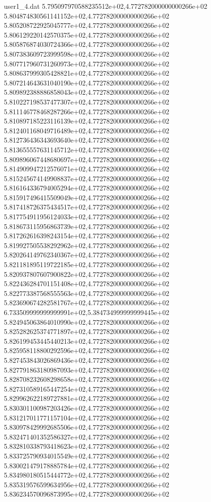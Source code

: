 \begin{filecontents}{user1_4.dat}
5.795097970588235512e+02,4.772782000000000266e+02
5.804874830561141152e+02,4.772782000000000266e+02
5.805208722925045777e+02,4.772782000000000266e+02
5.806129220142570375e+02,4.772782000000000266e+02
5.805876874030724366e+02,4.772782000000000266e+02
5.807383609723999598e+02,4.772782000000000266e+02
5.807717960731260973e+02,4.772782000000000266e+02
5.808637999305428821e+02,4.772782000000000266e+02
5.807214643631040190e+02,4.772782000000000266e+02
5.809892388886858043e+02,4.772782000000000266e+02
5.810227198537477307e+02,4.772782000000000266e+02
5.811146778468287266e+02,4.772782000000000266e+02
5.810897185223116139e+02,4.772782000000000266e+02
5.812401168049716489e+02,4.772782000000000266e+02
5.812736436343693640e+02,4.772782000000000266e+02
5.813655557631145712e+02,4.772782000000000266e+02
5.809896067448680697e+02,4.772782000000000266e+02
5.814909947212576071e+02,4.772782000000000266e+02
5.815245674149908837e+02,4.772782000000000266e+02
5.816164336794005294e+02,4.772782000000000266e+02
5.815917496415509049e+02,4.772782000000000266e+02
5.817418726375434517e+02,4.772782000000000266e+02
5.817754911956124033e+02,4.772782000000000266e+02
5.818673115956863739e+02,4.772782000000000266e+02
5.817262616398243154e+02,4.772782000000000266e+02
5.819927505538292962e+02,4.772782000000000266e+02
5.820264149762340367e+02,4.772782000000000266e+02
5.821181895119722185e+02,4.772782000000000266e+02
5.820937807607900822e+02,4.772782000000000266e+02
5.822436284701151408e+02,4.772782000000000266e+02
5.822773387568555563e+02,4.772782000000000266e+02
5.823690674282581767e+02,4.772782000000000266e+02
6.733509999999999991e+02,5.384734999999999445e+02
5.824945063864010990e+02,4.772782000000000266e+02
5.825282625374771897e+02,4.772782000000000266e+02
5.826199453445440213e+02,4.772782000000000266e+02
5.825958118800292596e+02,4.772782000000000266e+02
5.827453843026869436e+02,4.772782000000000266e+02
5.827791863180987093e+02,4.772782000000000266e+02
5.828708232608298658e+02,4.772782000000000266e+02
5.827310589165447254e+02,4.772782000000000266e+02
5.829962622189727881e+02,4.772782000000000266e+02
5.830301100987203426e+02,4.772782000000000266e+02
5.831217011771157104e+02,4.772782000000000266e+02
5.830978429992685506e+02,4.772782000000000266e+02
5.832471401352586327e+02,4.772782000000000266e+02
5.832810338793418623e+02,4.772782000000000266e+02
5.833725790934015549e+02,4.772782000000000266e+02
5.830021479178885784e+02,4.772782000000000266e+02
5.834980180515444772e+02,4.772782000000000266e+02
5.835319576599634956e+02,4.772782000000000266e+02
5.836234570096873995e+02,4.772782000000000266e+02

\end{filecontents}
